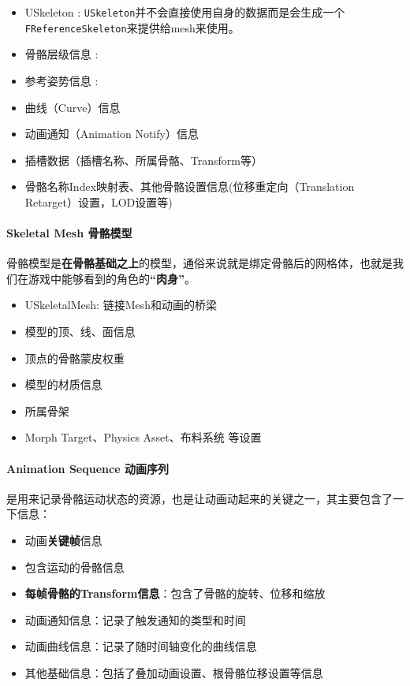 \documentclass[UTF8,a4paper,12pt]{ctexbook}
\begin{document}
				\begin{itemize}
					\item USkeleton : \verb|USkeleton|并不会直接使用自身的数据而是会生成一个\verb|FReferenceSkeleton|来提供给mesh来使用。
					\item 骨骼层级信息 :
					\item 参考姿势信息 :
					\item 曲线（Curve）信息
					\item 动画通知（Animation Notify）信息
					\item 插槽数据（插槽名称、所属骨骼、Transform等）
					\item 骨骼名称Index映射表、其他骨骼设置信息(位移重定向（Translation Retarget）设置，LOD设置等)
				\end{itemize}
			
			\paragraph{Skeletal Mesh 骨骼模型}
				骨骼模型是\textbf{在骨骼基础之上}的模型，通俗来说就是绑定骨骼后的网格体，也就是我们在游戏中能够看到的角色的\textbf{“肉身”}。
				\begin{itemize}
					\item USkeletalMesh: 链接Mesh和动画的桥梁
					\item 模型的顶、线、面信息
					\item 顶点的骨骼蒙皮权重
					\item 模型的材质信息
					\item 所属骨架
					\item Morph Target、Physics Asset、布料系统 等设置
				\end{itemize}
			
			
			\paragraph{Animation Sequence 动画序列}
				是用来记录骨骼运动状态的资源，也是让动画动起来的关键之一，其主要包含了一下信息：
				
				\begin{itemize}
					\item 动画\textbf{关键帧}信息
					\item 包含运动的骨骼信息
					\item \textbf{每帧骨骼的Transform信息}：包含了骨骼的旋转、位移和缩放
					\item 动画通知信息：记录了触发通知的类型和时间
					\item 动画曲线信息：记录了随时间轴变化的曲线信息
					\item 其他基础信息：包括了叠加动画设置、根骨骼位移设置等信息
				\end{itemize}
			
\end{document}
